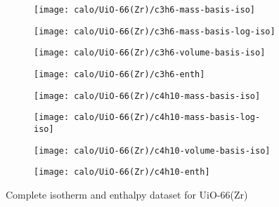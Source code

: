 \begin{figure}[H]
    \begin{subfigure}{0.25\textwidth}
        \texttt{[image: calo/UiO-66(Zr)/c3h6-mass-basis-iso]}%
        \label{appx:fgr:shaping:uio66c3h6mass}
    \end{subfigure}%
    \begin{subfigure}{0.25\textwidth}
        \texttt{[image: calo/UiO-66(Zr)/c3h6-mass-basis-log-iso]}%
        \label{appx:fgr:shaping:uio66c3h6masslog}
    \end{subfigure}%
    \begin{subfigure}{0.25\textwidth}
        \texttt{[image: calo/UiO-66(Zr)/c3h6-volume-basis-iso]}%
        \label{appx:fgr:shaping:uio66c3h6volume}
    \end{subfigure}%
    \begin{subfigure}{0.25\textwidth}
        \texttt{[image: calo/UiO-66(Zr)/c3h6-enth]}%
        \label{appx:fgr:shaping:uio66c3h6enth}%
    \end{subfigure}%

    \begin{subfigure}{0.25\textwidth}
        \texttt{[image: calo/UiO-66(Zr)/c4h10-mass-basis-iso]}%
        \label{appx:fgr:shaping:uio66c4h10mass}
    \end{subfigure}%
    \begin{subfigure}{0.25\textwidth}
        \texttt{[image: calo/UiO-66(Zr)/c4h10-mass-basis-log-iso]}%
        \label{appx:fgr:shaping:uio66c4h10masslog}
    \end{subfigure}%
    \begin{subfigure}{0.25\textwidth}
        \texttt{[image: calo/UiO-66(Zr)/c4h10-volume-basis-iso]}%
        \label{appx:fgr:shaping:uio66c4h10volume}
    \end{subfigure}%
    \begin{subfigure}{0.25\textwidth}
        \texttt{[image: calo/UiO-66(Zr)/c4h10-enth]}%
        \label{appx:fgr:shaping:uio66c4h10enth}%
    \end{subfigure}%

    \caption{Complete isotherm and enthalpy dataset for UiO-66(Zr)}%
    \label{appx:fgr:shaping:calouio66}
\end{figure}
